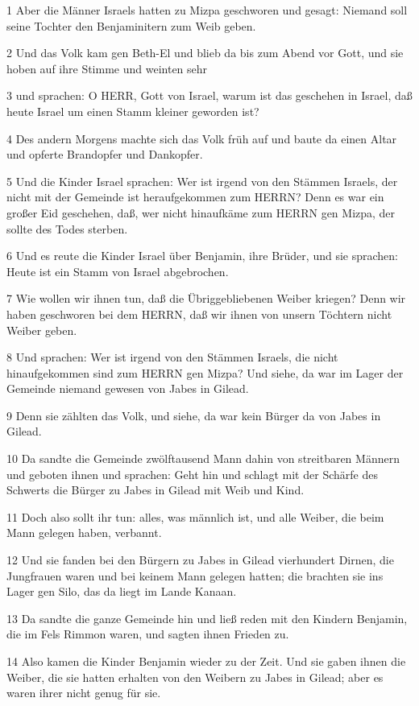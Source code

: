 \par 1 Aber die Männer Israels hatten zu Mizpa geschworen und gesagt: Niemand soll seine Tochter den Benjaminitern zum Weib geben.
\par 2 Und das Volk kam gen Beth-El und blieb da bis zum Abend vor Gott, und sie hoben auf ihre Stimme und weinten sehr
\par 3 und sprachen: O HERR, Gott von Israel, warum ist das geschehen in Israel, daß heute Israel um einen Stamm kleiner geworden ist?
\par 4 Des andern Morgens machte sich das Volk früh auf und baute da einen Altar und opferte Brandopfer und Dankopfer.
\par 5 Und die Kinder Israel sprachen: Wer ist irgend von den Stämmen Israels, der nicht mit der Gemeinde ist heraufgekommen zum HERRN? Denn es war ein großer Eid geschehen, daß, wer nicht hinaufkäme zum HERRN gen Mizpa, der sollte des Todes sterben.
\par 6 Und es reute die Kinder Israel über Benjamin, ihre Brüder, und sie sprachen: Heute ist ein Stamm von Israel abgebrochen.
\par 7 Wie wollen wir ihnen tun, daß die Übriggebliebenen Weiber kriegen? Denn wir haben geschworen bei dem HERRN, daß wir ihnen von unsern Töchtern nicht Weiber geben.
\par 8 Und sprachen: Wer ist irgend von den Stämmen Israels, die nicht hinaufgekommen sind zum HERRN gen Mizpa? Und siehe, da war im Lager der Gemeinde niemand gewesen von Jabes in Gilead.
\par 9 Denn sie zählten das Volk, und siehe, da war kein Bürger da von Jabes in Gilead.
\par 10 Da sandte die Gemeinde zwölftausend Mann dahin von streitbaren Männern und geboten ihnen und sprachen: Geht hin und schlagt mit der Schärfe des Schwerts die Bürger zu Jabes in Gilead mit Weib und Kind.
\par 11 Doch also sollt ihr tun: alles, was männlich ist, und alle Weiber, die beim Mann gelegen haben, verbannt.
\par 12 Und sie fanden bei den Bürgern zu Jabes in Gilead vierhundert Dirnen, die Jungfrauen waren und bei keinem Mann gelegen hatten; die brachten sie ins Lager gen Silo, das da liegt im Lande Kanaan.
\par 13 Da sandte die ganze Gemeinde hin und ließ reden mit den Kindern Benjamin, die im Fels Rimmon waren, und sagten ihnen Frieden zu.
\par 14 Also kamen die Kinder Benjamin wieder zu der Zeit. Und sie gaben ihnen die Weiber, die sie hatten erhalten von den Weibern zu Jabes in Gilead; aber es waren ihrer nicht genug für sie.
